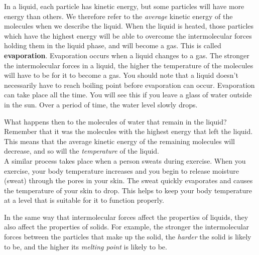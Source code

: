 \begin{itemize}
{In a liquid, each particle has kinetic energy, but some particles will have more energy than others. We therefore refer to the \textit{average} kinetic energy of the molecules when we describe the liquid. When the liquid is heated, those particles which have the highest energy will be able to overcome the intermolecular forces holding them in the liquid phase, and will become a gas. This is called \textbf{evaporation}. Evaporation occurs when a liquid changes to a gas. The stronger the intermolecular forces in a liquid, the higher the temperature of the molecules will have to be for it to become a gas. You should note that a liquid doesn't necessarily have to reach boiling point before evaporation can occur. Evaporation can take place all the time. You will see this if you leave a glass of water outside in the sun. Over a period of time, the water level slowly drops.

What happens then to the molecules of water that remain in the liquid? Remember that it was the molecules with the highest energy that left the liquid. This means that the average kinetic energy of the remaining molecules will decrease, and so will the \textit{temperature} of the liquid.\\

A similar process takes place when a person sweats during exercise. When you exercise, your body temperature increases and you begin to release moisture (sweat) through the pores in your skin. The sweat quickly evaporates and causes the temperature of your skin to drop. This helps to keep your body temperature at a level that is suitable for it to function properly.}
\end{itemize}
In the same way that intermolecular forces affect the properties of liquids, they also affect the properties of solids. For example, the stronger the intermolecular forces between the particles that make up the solid, the \textit{harder} the solid is likely to be, and the higher its \textit{melting point} is likely to be.


